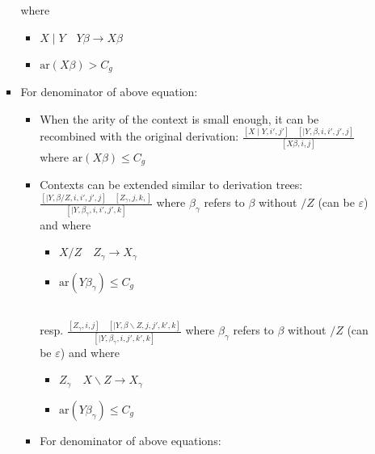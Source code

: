 \begin{itemize}
\begin{itemize}
\begin{itemize}
            where
            \begin{itemize}
                \item $X \mid Y \quad Y\beta \to X\beta$
                \item $\text{ar}(X \beta) > C_g$
            \end{itemize}
            \item For denominator of above equation:
            \begin{itemize}
                \item When the arity of the context is small enough, it can be recombined with the original derivation:
                $
                \frac{[X \mid Y, i', j'] \quad [\mid Y, \beta, i, i', j', j]}{[X \beta, i, j]}
                $ where $\text{ar}(X \beta) \leq C_g$
                \item Contexts can be extended similar to derivation trees:
                $
                \frac{[\mid Y, \beta / Z, i, i', j', j] \quad [Z_\gamma, j, k,]}{[\mid Y, \beta_\gamma, i, i', j', k]}
                $ where $\beta_\gamma$ refers to $\beta$ without $/ Z$ (can be $\varepsilon$) and where 
                \begin{itemize}
                    \item $X / Z \quad Z_\gamma \to X_\gamma$
                    \item $\text{ar}(Y \beta_\gamma) \leq C_g$
                \end{itemize}\\
                resp.
                $
                \frac{[Z_\gamma, i, j] \quad [\mid Y, \beta \backslash Z, j, j', k', k]}{[\mid Y, \beta_\gamma, i, j', k', k]} 
                $ where $\beta_\gamma$ refers to $\beta$ without $/ Z$ (can be $\varepsilon$) and where 
                \begin{itemize}
                    \item $Z_\gamma \quad X \backslash Z \to X_\gamma$
                    \item $\text{ar}(Y \beta_\gamma) \leq C_g$
                \end{itemize}
                \item For denominator of above equations:
\end{itemize}
\end{itemize}
\end{itemize}
\end{itemize}
